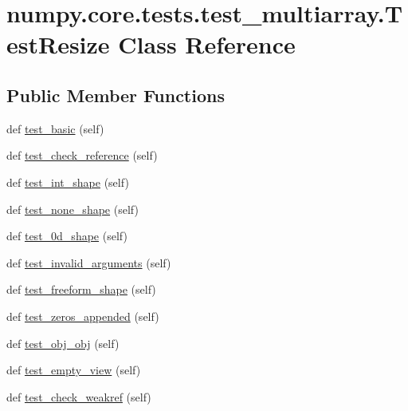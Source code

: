 \hypertarget{classnumpy_1_1core_1_1tests_1_1test__multiarray_1_1TestResize}{}\section{numpy.\+core.\+tests.\+test\+\_\+multiarray.\+Test\+Resize Class Reference}
\label{classnumpy_1_1core_1_1tests_1_1test__multiarray_1_1TestResize}
\subsection*{Public Member Functions}
\begin{DoxyCompactItemize}
\item 
def \hyperlink{classnumpy_1_1core_1_1tests_1_1test__multiarray_1_1TestResize_a3be62986de0618e98bcef5b413dc8cef}{test\+\_\+basic} (self)
\item 
def \hyperlink{classnumpy_1_1core_1_1tests_1_1test__multiarray_1_1TestResize_a9dd5f7692b7a64a260be39c53b7bd8cc}{test\+\_\+check\+\_\+reference} (self)
\item 
def \hyperlink{classnumpy_1_1core_1_1tests_1_1test__multiarray_1_1TestResize_a146c14a71a9b3ab3be581327fa41cc9a}{test\+\_\+int\+\_\+shape} (self)
\item 
def \hyperlink{classnumpy_1_1core_1_1tests_1_1test__multiarray_1_1TestResize_a0aca86471eaf81c83e0f6c66dc8694cc}{test\+\_\+none\+\_\+shape} (self)
\item 
def \hyperlink{classnumpy_1_1core_1_1tests_1_1test__multiarray_1_1TestResize_a5abb3ea39afd3fc762a37f3f09dae6cd}{test\+\_\+0d\+\_\+shape} (self)
\item 
def \hyperlink{classnumpy_1_1core_1_1tests_1_1test__multiarray_1_1TestResize_a4fefde0c0772357349c7517e714920b6}{test\+\_\+invalid\+\_\+arguments} (self)
\item 
def \hyperlink{classnumpy_1_1core_1_1tests_1_1test__multiarray_1_1TestResize_a05cbf4a400fe1178821302e9341f204a}{test\+\_\+freeform\+\_\+shape} (self)
\item 
def \hyperlink{classnumpy_1_1core_1_1tests_1_1test__multiarray_1_1TestResize_a55bf09cacb878be736025bcd98a21c0e}{test\+\_\+zeros\+\_\+appended} (self)
\item 
def \hyperlink{classnumpy_1_1core_1_1tests_1_1test__multiarray_1_1TestResize_afaa069ddac731272ff80b22b6150c124}{test\+\_\+obj\+\_\+obj} (self)
\item 
def \hyperlink{classnumpy_1_1core_1_1tests_1_1test__multiarray_1_1TestResize_ad1432f198dd7be81c823ef40d52b7cc4}{test\+\_\+empty\+\_\+view} (self)
\item 
def \hyperlink{classnumpy_1_1core_1_1tests_1_1test__multiarray_1_1TestResize_ab5e2cbe06c7471e7cd501a0d23c3465a}{test\+\_\+check\+\_\+weakref} (self)
\end{DoxyCompactItemize}


